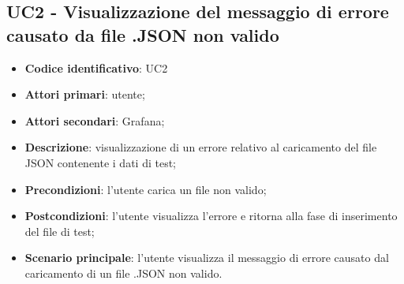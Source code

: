 \subsection{UC2 - Visualizzazione del messaggio di errore causato da file .JSON non valido}
\begin{itemize}
	\item \textbf{Codice identificativo}: UC2
	\item \textbf{Attori primari}: utente;
	\item \textbf{Attori secondari}: Grafana\glo;
	\item \textbf{Descrizione}: visualizzazione di un errore relativo al caricamento del file JSON contenente i dati di test;
	\item \textbf{Precondizioni}: l'utente carica un file non valido;
	\item \textbf{Postcondizioni}: l'utente visualizza l'errore e ritorna alla fase di inserimento del file di test;	
	\item \textbf{Scenario principale}: l'utente visualizza il messaggio di errore causato dal caricamento di un file .JSON non 		valido.	
\end{itemize}
